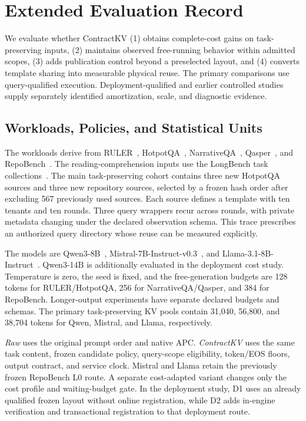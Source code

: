 \section{Extended Evaluation Record}
\label{sec:evaluation}

We evaluate whether ContractKV (1) obtains complete-cost gains on task-preserving inputs, (2) maintains observed free-running behavior within admitted scopes, (3) adds publication control beyond a preselected layout, and (4) converts template sharing into measurable physical reuse. The primary comparisons use query-qualified execution. Deployment-qualified and earlier controlled studies supply separately identified amortization, scale, and diagnostic evidence.

\subsection{Workloads, Policies, and Statistical Units}
\label{sec:protocol}
The workloads derive from RULER~\cite{ruler2024}, HotpotQA~\cite{hotpotqa2018}, NarrativeQA~\cite{narrativeqa2018}, Qasper~\cite{qasper2021}, and RepoBench~\cite{repobench2024}. The reading-comprehension inputs use the LongBench task collections~\cite{longbench2024}. The main task-preserving cohort contains three new HotpotQA sources and three new repository sources, selected by a frozen hash order after excluding 567 previously used sources. Each source defines a template with ten tenants and ten rounds. Three query wrappers recur across rounds, with private metadata changing under the declared observation schema. This trace prescribes an authorized query directory whose reuse can be measured explicitly.

The models are Qwen3-8B~\cite{qwen32025}, Mistral-7B-Instruct-v0.3~\cite{mistral2023}, and Llama-3.1-8B-Instruct~\cite{llama32024}. Qwen3-14B is additionally evaluated in the deployment cost study. Temperature is zero, the seed is fixed, and the free-generation budgets are 128 tokens for RULER/HotpotQA, 256 for NarrativeQA/Qasper, and 384 for RepoBench. Longer-output experiments have separate declared budgets and schemas. The primary task-preserving KV pools contain 31,040, 56,800, and 38,704 tokens for Qwen, Mistral, and Llama, respectively.

\emph{Raw} uses the original prompt order and native APC. \emph{ContractKV} uses the same task content, frozen candidate policy, query-scope eligibility, token/EOS floors, output contract, and service clock. Mistral and Llama retain the previously frozen RepoBench L0 route. A separate cost-adapted variant changes only the cost profile and waiting-budget gate. In the deployment study, D1 uses an already qualified frozen layout without online registration, while D2 adds in-engine verification and transactional registration to that deployment route.

